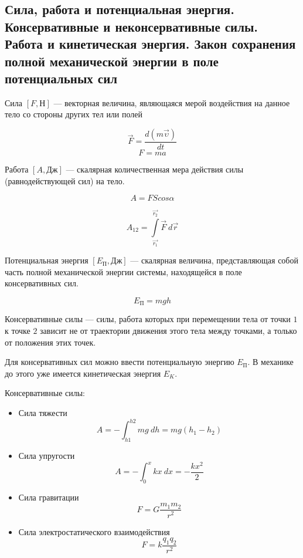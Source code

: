 \subsection{Сила, работа и потенциальная энергия. Консервативные и неконсервативные силы. Работа и кинетическая энергия. Закон сохранения полной механической энергии в поле потенциальных сил}

\begin{definition}
    Сила $[F, Н]$ — векторная величина, являющаяся мерой воздействия на данное тело со стороны других тел или полей
\end{definition}

$$\vec F=\frac{d(m\vec\upsilon)}{dt}$$ 
$$F=ma$$

\begin{definition}
    Работа $[A, Дж]$ — скалярная количественная мера действия силы (равнодействующей сил) на тело.
\end{definition}

$$A=FScos\alpha$$

$$A_{12}=\int\limits_{\vec{r_1}}^{\vec{r_2}}\vec F\ d\vec r$$

\begin{definition}
    Потенциальная энергия $[E_П, Дж]$ — скалярная величина, представляющая собой часть полной механической энергии системы, находящейся в поле консервативных сил.
\end{definition}

$$E_П=mgh$$

\begin{definition}
    Консервативные силы — силы, работа которых при перемещении тела от точки $1$ к точке $2$ 
    зависит не от траектории движения этого тела между точками, а только от положения этих точек.
\end{definition}

Для консервативных сил можно ввести потенциальную энергию $E_П$. В механике до этого уже имеется кинетическая энергия $E_K$.

Консервативные силы:

\begin{itemize}
    \item Сила тяжести
    $$A=-\int_{h1}^{h2}mg\ dh=mg(h_1-h_2)$$
    \item Сила упругости
    $$A=-\int_0^xkx\ dx=-\frac{kx^2}{2}$$
    \item Сила гравитации
    $$F=G\frac{m_1m_2}{r^2}$$
    \item Сила электростатического взаимодействия
    $$F=k\frac{q_1q_2}{r^2}$$
\end{itemize}

